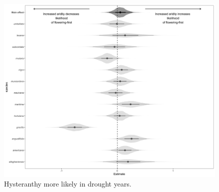 \documentclass{article}\usepackage[]{graphicx}\usepackage[]{color}
\begin{document}
\begin{figure}[h!]
    \centering
 \includegraphics[width=\textwidth]{..//..//Plots/droughtstuff.jpg}
    \caption{Hysteranthy more likely in drought years.}
    \label{fig:plastic}
\end{figure}
\end{document}
